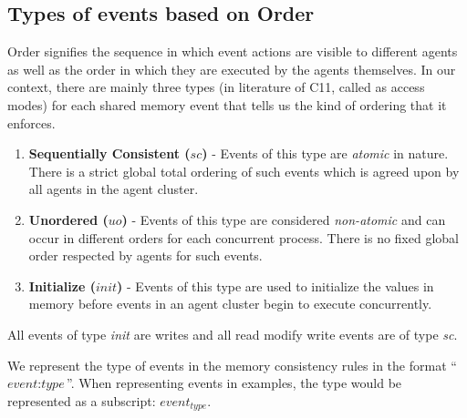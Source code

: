 

    
    \subsection{Types of events based on Order} 
        Order signifies the sequence in which event actions are visible to different agents as well as the order in which they are executed by the agents themselves. In our context, there are mainly three types (in literature of C11, called as access modes) for each shared memory event that tells us the kind of ordering that it enforces. 
        
        \begin{enumerate}
            \item \textbf{Sequentially Consistent ($sc$)} - Events of this type are \textit{atomic} in nature. There is a strict global total ordering of such events which is agreed upon by all agents in the agent cluster. 
            
            \item \textbf{Unordered ($uo$)} - Events of this type are considered \textit{non-atomic} and can occur in different orders for each concurrent process. There is no fixed global order respected by agents for such events. 
            
            \item \textbf{Initialize ($init$)} - Events of this type are used to initialize the values in memory before events in an agent cluster begin to execute concurrently. 
        \end{enumerate}

        All events of type \textit{init} are writes and all read modify write events are of type \textit{sc}.

        
        We represent the type of events in the memory consistency rules in the format ``$\textit{event} : \textit{type}$''. 
        When representing events in examples, the type would be represented as a subscript: $\textit{event}_\textit{type}$. 
        
